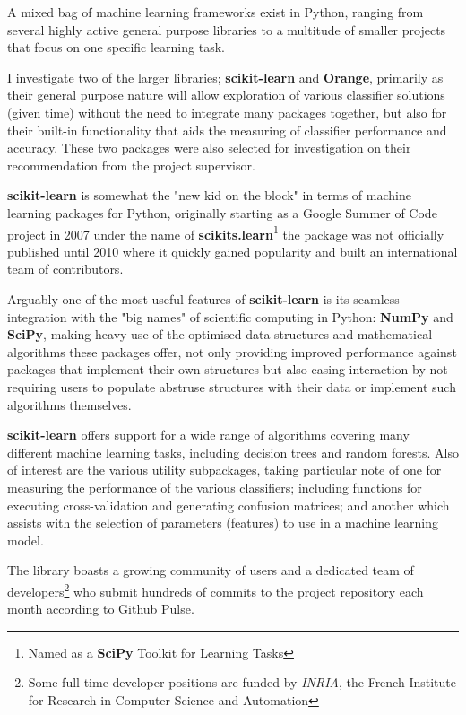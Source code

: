 A mixed bag of machine learning frameworks exist in Python\citep{py:for-ai},
ranging from several highly active general purpose libraries to a multitude of
smaller projects that focus on one specific learning task.

I investigate two of the larger libraries;
\textbf{scikit-learn}\citep{scikit-learn} and \textbf{Orange}\citep{orange},
primarily as their general purpose nature will allow exploration of various
classifier solutions (given time) without the need to integrate many packages
together, but also for their built-in functionality that aids the measuring of
classifier performance and accuracy. These two packages were also selected for
investigation on their recommendation from the project supervisor.


\textbf{scikit-learn} is somewhat the "new kid on the block" in terms of machine
learning packages for Python, originally starting as a Google Summer of Code
project in 2007 under the name of \textbf{scikits.learn}\footnote{Named as a
\textbf{SciPy} Toolkit for Learning Tasks} the package was not officially
published until 2010 where it quickly gained popularity and built an
international team of contributors\citep{about-scikit-learn}.

Arguably one of the most useful features of \textbf{scikit-learn} is its
seamless integration with the "big names" of scientific computing in Python:
\textbf{NumPy}\citep{NumPySciPy} and \textbf{SciPy}\citep{SciPy}, making heavy
use of the optimised data structures and mathematical algorithms these packages
offer, not only providing improved performance against packages that implement
their own structures but also easing interaction by not requiring users to
populate abstruse structures with their data or implement such algorithms
themselves.

\textbf{scikit-learn} offers support for a wide range of algorithms covering
many different machine learning tasks, including decision trees and random
forests. Also of interest are the various utility subpackages, taking particular
note of one for measuring the performance of the various classifiers;
including functions for executing cross-validation and generating confusion
matrices; and another which assists with the selection of parameters (features)
to use in a machine learning model.

The library boasts a growing community of users and a dedicated team of
developers\footnote{Some full time developer positions are funded by
\textit{INRIA}, the French Institute for Research in Computer Science and
Automation} who submit hundreds of commits to the project repository each month
according to Github Pulse.



